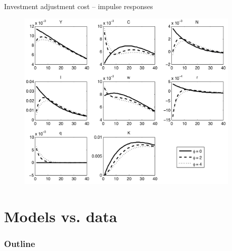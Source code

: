 \documentclass{beamer}
\begin{document}
\begin{frame}{Investment adjustment cost -- impulse responses}
  \begin{figure}[ht]
	\centering
	\includegraphics[width=0.95\textwidth]{FIGURES/inv_adj_cost_IRF_EricSims}
  \end{figure}
\end{frame}

\section{Models vs. data}
\begin{frame}
\frametitle{Outline}
\tableofcontents[currentsection]
\end{frame}
\end{document}
